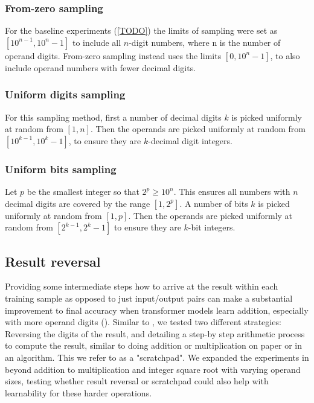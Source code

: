 \subsubsection{From-zero sampling}
\label{methods:sampling:basic}

For the baseline experiments (\cref{TODO}) the limits of sampling were set as $[10^{n-1}, 10^n - 1]$ to include all $n$-digit numbers, where n is the number of operand digits. From-zero sampling instead uses the limits $[0, 10^n - 1]$, to also include operand numbers with fewer decimal digits.

\subsubsection{Uniform digits sampling}

For this sampling method, first a number of decimal digits $k$ is picked uniformly at random from $[1, n]$. Then the operands are picked uniformly at random from $[10^{k-1}, 10^k - 1]$, to ensure they are $k$-decimal digit integers.

\subsubsection{Uniform bits sampling}

Let $p$ be the smallest integer so that $2^p \geq {10}^n$. This ensures all numbers with $n$ decimal digits are covered by the range $[1, 2^p]$.
A number of bits $k$ is picked uniformly at random from $[1, p]$. Then the operands are picked uniformly at random from $[2^{k-1}, 2^k - 1]$ to ensure they are $k$-bit integers.




\subsection{Result reversal}
\label{methods:reversal}

Providing some intermediate steps how to arrive at the result within each training sample as opposed to just input/output pairs can make a substantial improvement to final accuracy when transformer models learn addition, especially with more operand digits ().
Similar to \cite{teaching}, we tested two different strategies: Reversing the digits of the result, and detailing a step-by step arithmetic process to compute the result, similar to doing addition or multiplication on paper or in an algorithm. This we refer to as a "scratchpad". We expanded the experiments in \cite{teaching} beyond addition to multiplication and integer square root with varying operand sizes, testing whether result reversal or scratchpad could also help with learnability for these harder operations.

